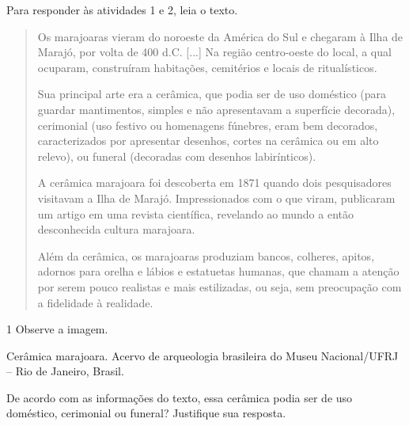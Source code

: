\begin{escolha}

Para responder às atividades 1 e 2, leia o texto.

\begin{quote}
Os marajoaras vieram do noroeste da América do Sul e chegaram à Ilha de
Marajó, por volta de 400 d.C. {[}...{]} Na região centro-oeste do local,
a qual ocuparam, construíram habitações, cemitérios e locais de
ritualísticos.

Sua principal arte era a cerâmica, que podia ser de uso doméstico (para
guardar mantimentos, simples e não apresentavam a superfície decorada),
cerimonial (uso festivo ou homenagens fúnebres, eram bem decorados,
caracterizados por apresentar desenhos, cortes na cerâmica ou em alto
relevo), ou funeral (decoradas com desenhos labirínticos).




A cerâmica marajoara foi descoberta em 1871 quando dois pesquisadores
visitavam a Ilha de Marajó. Impressionados com o que viram, publicaram
um artigo em uma revista científica, revelando ao mundo a então
desconhecida cultura marajoara.

Além da cerâmica, os marajoaras produziam bancos, colheres, apitos,
adornos para orelha e lábios e estatuetas humanas, que chamam a atenção
por serem pouco realistas e mais estilizadas, ou seja, sem preocupação
com a fidelidade à realidade.

\end{quote}

\num{1} Observe a imagem.

Cerâmica marajoara. Acervo de arqueologia brasileira do Museu
Nacional/UFRJ -- Rio de Janeiro, Brasil.


De acordo com as informações do texto, essa cerâmica podia ser de uso
doméstico, cerimonial ou funeral? Justifique sua resposta.


\end{escolha}
